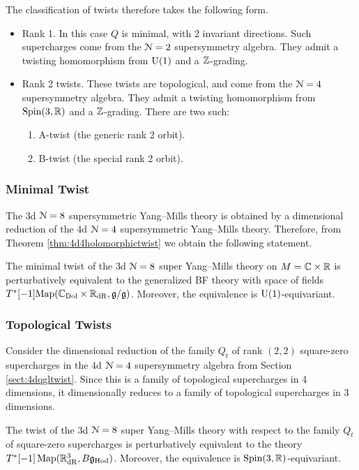 \documentclass[10pt, oneside]{article}
\begin{document}
The classification of twists therefore takes the following form.
\begin{itemize}
 \item Rank 1.  In this case $Q$ is minimal, with 2 invariant directions.  Such supercharges come from the $\mathcal{N}=2$ supersymmetry algebra.  They admit a twisting homomorphism from $\mathrm{U}(1)$ and a $\mathbb Z$-grading.
 \item Rank 2 twists. These twists are topological, and come from the $\mathcal{N}=4$ supersymmetry algebra. They admit a twisting homomorphism from $\mathrm{Spin}(3, \mathbb R)$ and a $\mathbb Z$-grading. There are two such:
 \begin{enumerate}
 \item A-twist (the generic rank 2 orbit).
 \item B-twist (the special rank 2 orbit).
 \end{enumerate}
\end{itemize}

\subsubsection{Minimal Twist}
\label{sect:3d8minimal_twist}

The 3d $\mathcal N=8$ supersymmetric Yang--Mills theory is obtained by a dimensional reduction of the 4d $\mathcal{N}=4$ supersymmetric Yang--Mills theory. Therefore, from Theorem \ref{thm:4d4holomorphictwist} we obtain the following statement.

\begin{theorem}  \label{3d_8_minimal_twist_thm}
The minimal twist of the 3d $\mathcal N=8$ super Yang--Mills theory on $M=\mathbb C\times \mathbb R$ is perturbatively equivalent to the generalized BF theory with space of fields $T^*[-1]\mathrm{Map}(\mathbb C_{\rm Dol} \times \mathbb R_{\mathrm{dR}}, \mathfrak g/\mathfrak g)$. Moreover, the equivalence is $\mathrm{U}(1)$-equivariant.
\end{theorem}

\subsubsection{Topological Twists}

Consider the dimensional reduction of the family $Q_t$ of rank $(2, 2)$ square-zero supercharges in the 4d $\mathcal N=4$ supersymmetry algebra from Section \ref{sect:4dqgltwist}. Since this is a family of topological supercharges in 4 dimensions, it dimensionally reduces to a family of topological supercharges in 3 dimensions.

\begin{theorem}
The twist of the 3d $\mathcal N=8$ super Yang--Mills theory with respect to the family $Q_t$ of square-zero supercharges is perturbatively equivalent to the theory $T^*[-1]\operatorname{Map}(\mathbb R^3_{\mathrm{dR}}, B\mathfrak g_{\mathrm{Hod}})$. Moreover, the equivalence is $\mathrm{Spin}(3, \mathbb R)$-equivariant.
\label{thm:3d8Hodgetwist}
\end{theorem}
\end{document}
